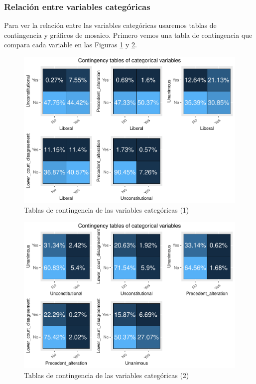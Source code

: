 \documentclass[
]{article}
\begin{document}
\hypertarget{relaciuxf3n-entre-variables-categuxf3ricas}{%
\subsubsection{Relación entre variables
categóricas}\label{relaciuxf3n-entre-variables-categuxf3ricas}}

Para ver la relación entre las variables categóricas usaremos tablas de
contingencia y gráficos de mosaico. Primero vemos una tabla de
contingencia que compara cada variable en las Figuras
\ref{fig:cat_grid1} y \ref{fig:cat_grid2}.

\begin{figure}

{\centering \includegraphics[width=0.75\linewidth]{anacalt-regresion_files/figure-latex/cat_grid1-1} 

}

\caption{Tablas de contingencia de las variables categóricas (1)}\label{fig:cat_grid1}
\end{figure}
\begin{figure}

{\centering \includegraphics[width=0.75\linewidth]{anacalt-regresion_files/figure-latex/cat_grid2-1} 

}

\caption{Tablas de contingencia de las variables categóricas (2)}\label{fig:cat_grid2}
\end{figure}
\end{document}
